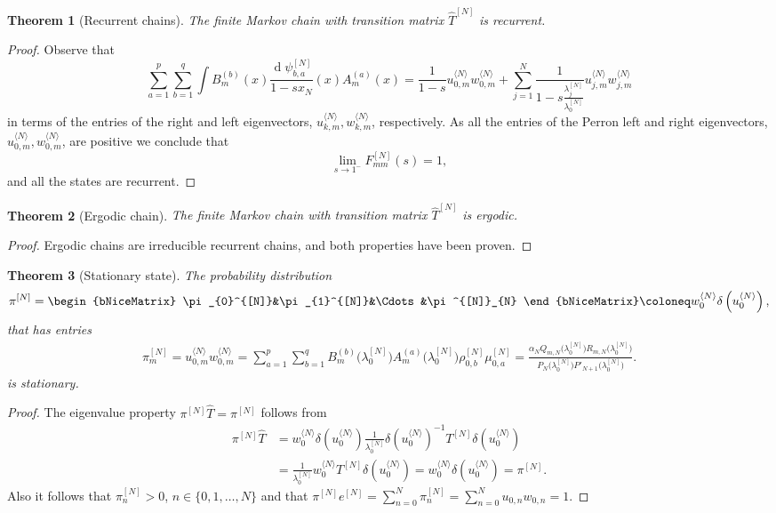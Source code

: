 \documentclass[11pt]{amsart}
\theoremstyle{plain}
\newtheorem{teo}{Theorem}[section]
\renewcommand{\d}{\operatorname{d}}
\newcommand{\1}{\text{\fontseries{bx}\selectfont \textup 1}}
\begin{document}
\begin{teo}[Recurrent chains]
	The finite Markov chain with transition matrix $\hat T^{[N]}$ is recurrent.
\end{teo}

\begin{proof}
	Observe that
	\[
	\sum_{a=1}^p\sum_{b=1}^{q}	\int B^{(b)}_m(x)\frac{\d\psi^{[N]}_{b,a}}{1-sx_N}(x)A^{(a)}_{m}(x)
	=
	\frac{1}{1-s}u^{{\langle N\rangle}}_{0,m}w^{{\langle N\rangle}}_{0,m}
	+\sum_{j=1}^{N}\frac{1}{1-s\frac{\lambda^{[N]}_j}{\lambda^{[N]}_0}}	u^{{\langle N\rangle}}_{j,m}w^{{\langle N\rangle}}_{j,m}
	\]
	in terms of the entries of the right and left eigenvectors, $u^{\langle N\rangle}_{k,m},w^{\langle N\rangle}_{k,m}$, respectively. As all the entries of the Perron left and right eigenvectors, $u^{\langle N\rangle}_{0,m},w^{\langle N\rangle}_{0,m}$, are positive we conclude that
	\[
	\lim\limits_{s\to 1^-}F_{mm}^{[N]}(s)=1,
	\]
	and all the states are recurrent.
\end{proof}


\begin{teo}[Ergodic chain]
	The finite Markov chain with transition matrix $\hat T^{[N]}$ is ergodic.
\end{teo}
\begin{proof}
	Ergodic chains are irreducible recurrent chains, and both properties have been proven.
\end{proof}


\begin{teo}[Stationary state]\label{teo:stationary_states_finite}
	The probability distribution \[ \pi^{[N]}=\begin{bNiceMatrix}
		\pi_{0}^{[N]}&\pi_{1}^{[N]}&\Cdots&\pi^{[N]}_{N}
	\end{bNiceMatrix}\coloneq
	w^{\langle N\rangle}_0\delta\left(u^{\langle N\rangle}_0\right), \]
	that has entries
	\begin{align*}
		\pi^{[N]}_m=u^{\langle N\rangle}_{0,m}w^{{\langle N\rangle}}_{0,m}=\sum_{a=1}^p\sum_{b=1}^q
		B_{m}^{(b)}\big(\lambda^{[N]}_0\big) A_{m}^{(a)}\big(\lambda^{[N]}_0\big)\rho^{[N]}_{0,b} \mu^{[N]}_{0,a}=
		\frac{ \alpha_N Q_{m,N}\big(\lambda^{[N]}_0\big)R_{m,N}\big(\lambda^{[N]}_0\big)
		}{
			P_{N}\big(\lambda^{[N]}_0\big)P'_{N+1}\big(\lambda^{[N]}_0\big)}.
	\end{align*}
	is stationary.
\end{teo}

\begin{proof}
	The eigenvalue property $\pi^{[N]}\hat T =\pi^{[N]}$ follows from
	\[
	\begin{aligned}
		\pi^{[N]}\hat T &= w^{\langle N\rangle}_0\delta(u^{\langle N\rangle}_0)\frac{1}{\lambda_0^{[N]}}\delta(u_0^{\langle N\rangle})^{-1} T^{[N]} \delta(u_0^{\langle N\rangle})\\&=
		\frac{1}{\lambda_0^{[N]}}	w^{\langle N\rangle}_0T^{[N]} \delta(u_0^{\langle N\rangle})=w^{\langle N\rangle}_0  \delta(u_0^{\langle N\rangle})=\pi^{[N]}.
	\end{aligned}
	\]
	Also it follows that $\pi^{[N]}_n>0$, $n\in\{0,1,\dots,N\}$ and that $\displaystyle \pi^{[N]}e^{[N]} =\sum_{n=0}^{N}\pi^{[N]}_n=\sum_{n=0}^{N} u_{0,n}w_{0,n}=1$.
\end{proof}
\end{document}
